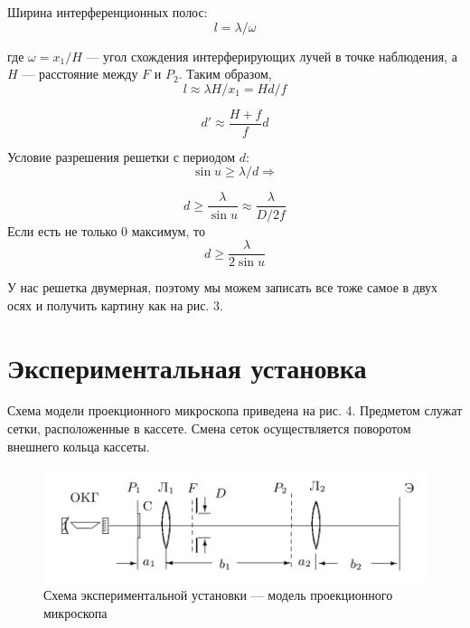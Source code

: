 \documentclass[a4paper,12pt]{report}
\begin{document}
	Ширина интерференционных полос:
	\begin{equation}
	l = \lambda/\omega
	\end{equation} 
	
	где $\omega = x_1/H$ --- угол схождения интерферирующих лучей в точке наблюдения, а $H$ --- расстояние между $F$ и $P_2$. Таким образом, 
	\begin{equation}
	l \approx \lambda H/x_1 = H d/f
	\end{equation}
	
	\begin{equation}
	d' \approx \dfrac{H + f}{f} d
	\end{equation}
	
	Условие разрешения решетки с периодом $d$:
	\begin{equation}
	\sin u \geqslant \lambda/d \Rightarrow 
	\end{equation}
	
	\begin{equation}
	d \geqslant \dfrac{\lambda}{\sin u} \approx \dfrac{\lambda}{D/2f}
	\end{equation}
	Если есть не только 0 максимум, то 
	\begin{equation}
	d \geqslant \dfrac{\lambda}{2 \sin u}
	\end{equation}
	
	У нас решетка двумерная, поэтому мы можем записать все тоже самое в двух осях и получить картину как на рис. 3.
	
	
\section*{Экспериментальная установка}

Схема модели проекционного микроскопа приведена на рис. 4. Предметом служат сетки, расположенные
в кассете. Смена сеток осуществляется поворотом внешнего кольца кассеты.

    \begin{figure}[h]
    \centering
    \includegraphics[width=15cm]{fig1.PNG}
    \caption{Схема экспериментальной установки — модель проекционного
микроскопа}
    \label{fig:vac}
\end{figure}
\end{document}
